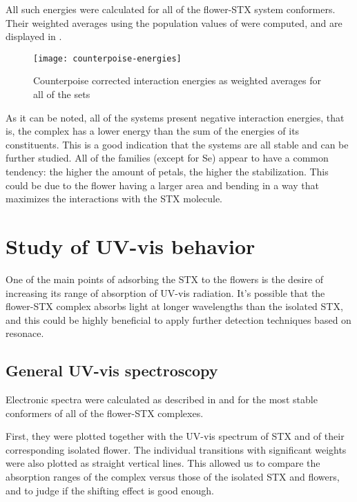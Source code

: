 All such energies were calculated for all of the flower-STX system conformers.
Their weighted averages using the population values of  were computed, and are displayed in .

\begin{figure}
    \texttt{[image: counterpoise-energies]}
    \caption[Counterpoise corrected interaction energies]{Counterpoise corrected interaction energies as weighted averages for all of the sets}
\end{figure}

As it can be noted, all of the systems present negative interaction energies, that is, the complex has a lower energy than the sum of the energies of its constituents.
This is a good indication that the systems are all stable and can be further studied.
All of the families (except for Se) appear to have a common tendency: the higher the amount of petals, the higher the stabilization. This could be due to the flower having a larger area and bending in a way that maximizes the interactions with the STX molecule.

\section{Study of UV-vis behavior}
One of the main points of adsorbing the STX to the flowers is the desire of increasing its range of absorption of UV-vis radiation.
It's possible that the flower-STX complex absorbs light at longer wavelengths than the isolated STX, and this could be highly beneficial to apply further detection techniques based on resonace.

\subsection{General UV-vis spectroscopy}
Electronic spectra were calculated as described in  and  for the most stable conformers of all of the flower-STX complexes.

First, they were plotted together with the UV-vis spectrum of STX and of their corresponding isolated flower.
The individual transitions with significant weights were also plotted as straight vertical lines.
This allowed us to compare the absorption ranges of the complex versus those of the isolated STX and flowers, and to judge if the shifting effect is good enough.

